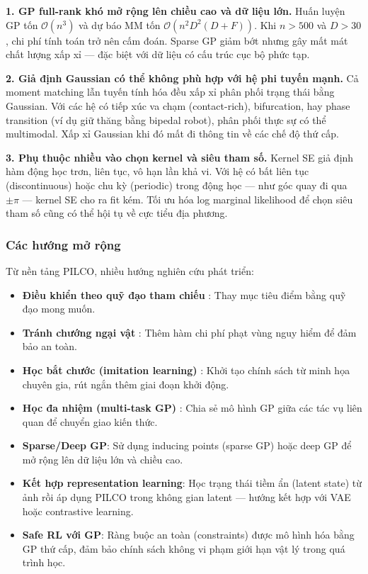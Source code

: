 \textbf{1. GP full-rank khó mở rộng lên chiều cao và dữ liệu lớn.}
Huấn luyện GP tốn $\mathcal{O}(n^3)$ và dự báo MM tốn $\mathcal{O}(n^2 D^2(D+F))$. Khi $n>500$ và $D>30$, chi phí tính toán trở nên cấm đoán. Sparse GP \cite{Snelson_Ghahramani_2006} giảm bớt nhưng gây mất mát chất lượng xấp xỉ --- đặc biệt với dữ liệu có cấu trúc cục bộ phức tạp.

\textbf{2. Giả định Gaussian có thể không phù hợp với hệ phi tuyến mạnh.}
Cả moment matching lẫn tuyến tính hóa đều xấp xỉ phân phối trạng thái bằng Gaussian. Với các hệ có tiếp xúc va chạm (contact-rich), bifurcation, hay phase transition (ví dụ giữ thăng bằng bipedal robot), phân phối thực sự có thể multimodal. Xấp xỉ Gaussian khi đó mất đi thông tin về các chế độ thứ cấp.

\textbf{3. Phụ thuộc nhiều vào chọn kernel và siêu tham số.}
Kernel SE giả định hàm động học trơn, liên tục, vô hạn lần khả vi. Với hệ có bất liên tục (discontinuous) hoặc chu kỳ (periodic) trong động học --- như góc quay đi qua $\pm\pi$ --- kernel SE cho ra fit kém. Tối ưu hóa log marginal likelihood để chọn siêu tham số cũng có thể hội tụ về cực tiểu địa phương.

\subsubsection{Các hướng mở rộng}
\label{SUB_SUB_SEC_extensions}

Từ nền tảng PILCO, nhiều hướng nghiên cứu phát triển:
\begin{itemize}
    \item \textbf{Điều khiển theo quỹ đạo tham chiếu} \cite{Pan_Theodorou_2014}: Thay mục tiêu điểm bằng quỹ đạo mong muốn.
    \item \textbf{Tránh chướng ngại vật} \cite{Chebotar_2014}: Thêm hàm chi phí phạt vùng nguy hiểm để đảm bảo an toàn.
    \item \textbf{Học bắt chước (imitation learning)} \cite{Kober_Peters_2011}: Khởi tạo chính sách từ minh họa chuyên gia, rút ngắn thêm giai đoạn khởi động.
    \item \textbf{Học đa nhiệm (multi-task GP)} \cite{Deisenroth_Huber_2014}: Chia sẻ mô hình GP giữa các tác vụ liên quan để chuyển giao kiến thức.
    \item \textbf{Sparse/Deep GP}: Sử dụng inducing points (sparse GP) hoặc deep GP để mở rộng lên dữ liệu lớn và chiều cao.
    \item \textbf{Kết hợp representation learning}: Học trạng thái tiềm ẩn (latent state) từ ảnh rồi áp dụng PILCO trong không gian latent --- hướng kết hợp với VAE hoặc contrastive learning.
    \item \textbf{Safe RL với GP}: Ràng buộc an toàn (constraints) được mô hình hóa bằng GP thứ cấp, đảm bảo chính sách không vi phạm giới hạn vật lý trong quá trình học.
\end{itemize}

